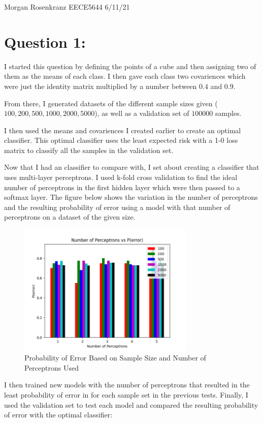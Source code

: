 \documentclass[11pt]{article}
\begin{document}
Morgan Rosenkranz 
EECE5644 
6/11/21 

\section*{Question 1:}

I started this question by defining the points of a cube and then assigning two of them as the means of each class.
I then gave each class two covariences which were just the identity matrix multiplied by a number between $0.4$ and $0.9$.

From there, I generated datasets of the different sample sizes given ($100,200,500,1000,2000,5000$), as well as a validation set of $100000$ samples.

I then used the means and covariences I created earlier to create an optimal classifier.
This optimal classifier uses the least expected risk with a 1-0 loss matrix to classify all the samples in the validation set.

Now that I had an classifier to compare with, I set about creating a classifier that uses multi-layer perceptrons.
I used k-fold cross validation to find the ideal number of perceptrons in the first hidden layer which were then passed to a softmax layer.
The figure below shows the variation in the number of perceptrons and the resulting probability of error using a model with that number of perceptrons on a dataset of the given size.

\begin{figure}[H]
	\centering
	\includegraphics[width=0.75\textwidth]{perceptrons}
	\caption{Probability of Error Based on Sample Size and Number of Perceptrons Used}
\end{figure}

I then trained new models with the number of perceptrons that resulted in the least probability of error in for each sample set in the previous tests.
Finally, I used the validation set to test each model and compared the resulting probability of error with the optimal classifier:
\end{document}

